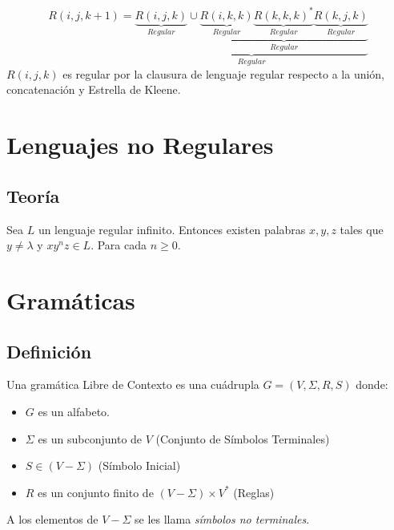 \begin{enumerate}
\begin{figure}[H]
\end{figure}

$$
R(i,j,k+1) = \underbrace{\underbrace{R(i,j,k)}_{Regular} \cup \underbrace{\underbrace{R(i,k,k)}_{Regular} \underbrace{R(k,k,k)^* }_{Regular}\underbrace{R(k,j,k)}_{Regular} }_{Regular}}_{Regular}
$$
$R(i,j,k)$ es regular por la clausura de lenguaje regular respecto a la unión, concatenación y Estrella de Kleene.
\end{enumerate}
\section{Lenguajes no Regulares}
\subsection{Teoría}
Sea $L$ un lenguaje regular infinito. Entonces existen palabras $x,y,z$ tales que $y\neq \lambda$ y $xy^n z\in L$. {\color{red} Para cada $n\geq 0$}.
\section{Gramáticas}
\subsection{Definición}
Una gramática Libre de Contexto es una cuádrupla $G=(V,\Sigma,R,S)$ donde:
\begin{itemize}
\item $G$ es un alfabeto.
\item  $\Sigma$ es un subconjunto de $V$ (Conjunto de Símbolos Terminales)
\item $S\in (V-\Sigma)$ (Símbolo Inicial)
\item $R$ es un conjunto finito de $(V-\Sigma)\times V^*$ (Reglas)
\end{itemize}

\begin{center}
\end{center}
A los elementos de $V-\Sigma$ se les llama \textit{símbolos no terminales}.
